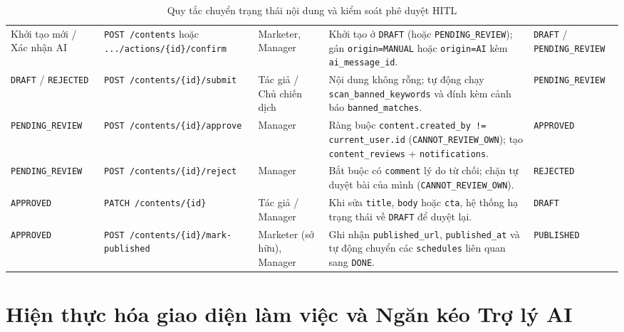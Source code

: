 \begin{table}[!htbp]
\centering
\scriptsize
\renewcommand{\arraystretch}{1.05}
\caption{Quy tắc chuyển trạng thái nội dung và kiểm soát phê duyệt HITL}
\label{tab:hitl-rules}
\begin{tabularx}{\textwidth}{|L{2.2cm}|L{3.3cm}|C{2.0cm}|Y|C{2.2cm}|}
\hline
{} &  &  &  & \\
\hline
Khởi tạo mới / Xác nhận AI & \texttt{POST /contents} hoặc \texttt{.../actions/\{id\}}\allowbreak\texttt{/confirm} & Marketer, Manager & Khởi tạo ở \texttt{DRAFT} (hoặc \texttt{PENDING\_REVIEW}); gán \texttt{origin=MANUAL} hoặc \texttt{origin=AI} kèm \texttt{ai\_message\_id}. & \texttt{DRAFT} / \texttt{PENDING\_}\allowbreak\texttt{REVIEW}\\
\hline
\texttt{DRAFT} / \texttt{REJECTED} & \texttt{POST /contents/\{id\}}\allowbreak\texttt{/submit} & Tác giả / Chủ chiến dịch & Nội dung không rỗng; tự động chạy \texttt{scan\_banned\_keywords} và đính kèm cảnh báo \texttt{banned\_matches}. & \texttt{PENDING\_}\allowbreak\texttt{REVIEW}\\
\hline
\texttt{PENDING\_}\allowbreak\texttt{REVIEW} & \texttt{POST /contents/\{id\}}\allowbreak\texttt{/approve} & Manager & Ràng buộc \texttt{content.created\_by != current\_user.id} (\texttt{CANNOT\_REVIEW\_OWN}); tạo \texttt{content\_reviews} + \texttt{notifications}. & \texttt{APPROVED}\\
\hline
\texttt{PENDING\_}\allowbreak\texttt{REVIEW} & \texttt{POST /contents/\{id\}}\allowbreak\texttt{/reject} & Manager & Bắt buộc có \texttt{comment} lý do từ chối; chặn tự duyệt bài của mình (\texttt{CANNOT\_REVIEW\_OWN}). & \texttt{REJECTED}\\
\hline
\texttt{APPROVED} & \texttt{PATCH /contents/\{id\}} & Tác giả / Manager & Khi sửa \texttt{title}, \texttt{body} hoặc \texttt{cta}, hệ thống hạ trạng thái về \texttt{DRAFT} để duyệt lại. & \texttt{DRAFT}\\
\hline
\texttt{APPROVED} & \texttt{POST /contents/\{id\}}\allowbreak\texttt{/mark-published} & Marketer (sở hữu), Manager & Ghi nhận \texttt{published\_url}, \texttt{published\_at} và tự động chuyển các \texttt{schedules} liên quan sang \texttt{DONE}. & \texttt{PUBLISHED}\\
\hline
\end{tabularx}
\end{table}

\section{Hiện thực hóa giao diện làm việc và Ngăn kéo Trợ lý AI}

